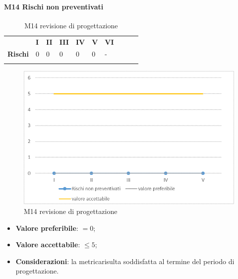 \paragraph{M14 Rischi non preventivati} \mbox{}
\begin{longtable}[H!] {						
		>{}p{50mm}  		
		>{}p{8mm}
		>{}p{8mm}		
		>{}p{8mm}		
		>{}p{8mm}		
		>{}p{8mm}		
		>{}p{8mm}
		>{}p{8mm}
		>{}p{8mm}
		>{}p{8mm}
	}
	\rowcolor{gray!50}
	\textbf{} & \textbf{I} & \textbf{II} & \textbf{III} & \textbf{IV} & \textbf{V} & \textbf{VI} \TBstrut \\ [2mm]
	\textbf{Rischi} & 0 & 0 & 0 & 0 & 0 & - \TBstrut \\ [2mm]
	\rowcolor{white}
	\caption{M14 revisione di progettazione\glo}
\end{longtable}
\begin{figure}[H] 	
\includegraphics[width=\linewidth]{./img/grafici/RP11.png}	
\caption{M14 revisione di progettazione\glo}	
\end{figure}
\begin{itemize}
	\item \textbf{Valore preferibile}: $=0$;
	\item \textbf{Valore accettabile}: $\le 5$;
	\item \textbf{Considerazioni}: la metrica\glosp risulta soddisfatta al termine del periodo di progettazione\glo.
\end{itemize}

